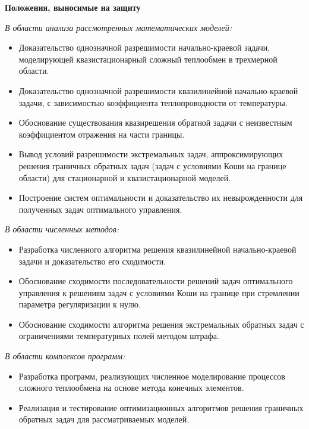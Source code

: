 \begin{frame}
    \textbf{Положения, выносимые на защиту}

    \textit{В области анализа рассмотренных математических моделей:}
    \begin{itemize}
        \item Доказательство однозначной разрешимости начально-краевой задачи,
        моделирующей квазистационарный сложный теплообмен в трехмерной
        области.
        \item Доказательство однозначной разрешимости квазилинейной начально-краевой задачи,
        с зависимостью коэффициента теплопроводности от температуры.
        \item Обоснование существования квазирешения обратной задачи с неизвестным
        коэффициентом отражения на части границы.
        \item Вывод условий разрешимости экстремальных задач, аппроксимирующих
        решения граничных обратных задач (задач с условиями Коши на границе области)
        для стационарной и квазистационарной моделей.
        \item Построение систем оптимальности и доказательство их невырожденности
        для полученных задач оптимального управления.
    \end{itemize}
        \textit{В области численных методов:}
    \begin{itemize}
        \item Разработка численного алгоритма решения квазилинейной начально-краевой задачи
        и доказательство его сходимости.
        \item Обоснование сходимости последовательности решений задач оптимального
        управления к решениям задач с условиями Коши на границе при
        стремлении параметра регуляризации к нулю.
        \item Обоснование сходимости алгоритма решения экстремальных обратных
        задач с ограничениями температурных полей методом штрафа.
    \end{itemize}

    \textit{В области комплексов программ:}
    \begin{itemize}
        \item Разработка программ, реализующих численное моделирование процессов
        сложного теплообмена на основе метода конечных элементов.
        \item Реализация и тестирование оптимизационных алгоритмов решения
        граничных обратных задач для рассматриваемых моделей.
    \end{itemize}
\end{frame}

